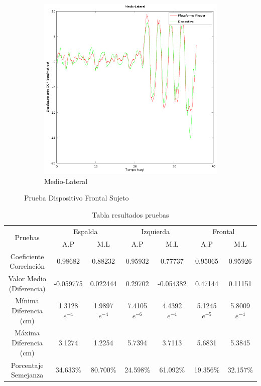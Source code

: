 \documentclass[12pt,a4paper]{article}
\begin{document}
\begin{itemize}
\begin{figure}[H]
\begin{subfigure}{.5\textwidth}
			\includegraphics[width=1\linewidth]{images/pruebas/Frontal/Medio-Lateral}
			\caption{Medio-Lateral}
			\label{fig:medioLateralFrontal}
		\end{subfigure}
		\caption{Prueba Dispositivo Frontal Sujeto}
		\label{fig:pruebaLateralFrontal}
	\end{figure}
	
	
	\begin{table}[H]
		\label{table:resultadosPruebas}
		\centering
		\begin{tabular}{|c|c|c|c|c|c|c|}
			\hline
			\multirow{2}{*}{Pruebas} &
			\multicolumn{2}{c|}{Espalda} &
			\multicolumn{2}{c|}{Izquierda} &
			\multicolumn{2}{c|}{Frontal} \\
			\cline{2-7}
			& A.P & M.L & A.P  & M.L & A.P & M.L \\
			\hline
			\shortstack{Coeficiente\\Correlación} & 0.98682 & 0.88232 & 0.95932 & 0.77737 & 0.95065 & 0.95926 \\
			\hline
			\shortstack{Valor Medio \\ (Diferencia)} & -0.059775 & 0.022444 & 0.29702 & -0.054382 & 0.47144 & 0.11151 \\
			\hline
			\shortstack{Mínima\\Diferencia (cm)} & 1.3128$e^{-4}$ & 1.9897$e^{-4}$ & 7.4105$e^{-6}$ & 4.4392$e^{-4}$ & 5.1245$e^{-5}$ & 5.8009$e^{-4}$ \\
			\hline
			\shortstack{Máxima\\Diferencia (cm)} & 3.1274 & 1.2254 & 5.7394 & 3.7113 & 5.6831 & 5.3845 \\
			\hline
			\shortstack{Porcentaje\\Semejanza} & 34.633\% & 80.700\% & 24.598\% & 61.092\% &19.356\% & 32.157\% \\
			\hline
		\end{tabular}
		\caption{Tabla resultados pruebas}
	\end{table}
	

\end{itemize}
\end{document}
